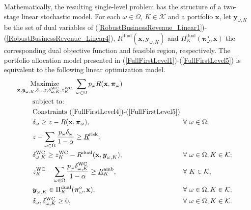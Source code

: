 	Mathematically, the resulting single-level problem has the structure of a two-stage linear stochastic model. For each $\omega \in \Omega$, $K \in \mathcal{K}$ and a portfolio $\mathbf{x}$, let $\boldsymbol{y}_{\omega, K}$ be the set of dual variables of (\ref{RobustBusinessRevenue_Linear1})-(\ref{RobustBusinessRevenue_Linear4}), $R^{\text{dual}}(\mathbf{x}, \boldsymbol{y}_{\omega, K})$ and $\Pi_{K}^{\text{dual}}(\boldsymbol{\pi}^{\text{o}}_{\omega}, \mathbf{x})$ the corresponding dual objective function and feasible region, respectively. The portfolio allocation model presented in (\ref{FullFirstLevel1})-(\ref{FullFirstLevel5}) is equivalent to the following linear optimization model.
%
\begin{align}
	& \hspace{-0.350cm} \Maximize_{\substack{\mathbf{x}, \boldsymbol{y}_{\omega, K}, \delta_{\omega}, z, \delta_{\omega, K}^{\text{WC}}, z_{K}^{\text{WC}}}} ~ \sum_{\omega \in \Omega} p_{\omega} R(\mathbf{x}, \boldsymbol{\pi}_{\omega}) && \label{CompleteModel1} \\
	& \hspace{0.50cm} \text{subject to:} \notag \\
	& \hspace{0.50cm} \text{Constraints} ~ (\ref{FullFirstLevel4})\text{-}(\ref{FullFirstLevel5}) \label{CompleteModel2} \\
	& \hspace{0.50cm} \delta_{\omega} \geq z - R(\mathbf{x}, \boldsymbol{\pi}_{\omega}), && \hspace{-0.20cm} \forall ~ \omega \in \Omega; \label{CompleteModel3} \\
	& \hspace{0.50cm} z - \sum_{\omega \in \Omega} \frac{p_{\omega} \delta_{\omega}}{1 - \alpha} \geq \underline{R}^{\text{risk}}; && \label{CompleteModel4} \\
	& \hspace{0.50cm} \delta_{\omega, K}^{\text{WC}} \geq z_{K}^{\text{WC}} - R^{\text{dual}}(\mathbf{x}, \boldsymbol{y}_{\omega, K}), && \hspace{-0.20cm} \forall ~ \omega \in \Omega, K \in \mathcal{K}; \label{CompleteModel5} \\
	& \hspace{0.50cm} z_{K}^{\text{WC}} - \sum_{\omega \in \Omega} \frac{p_{\omega} \delta_{\omega, K}^{\text{WC}}}{1 - \alpha} \geq \underline{R}_{K}^{\text{amb}}, && \hspace{-0.20cm} \forall ~ K \in \mathcal{K}; \label{CompleteModel6} \\
	& \hspace{0.50cm} \boldsymbol{y}_{\omega, K} \in \Pi_{K}^{\text{dual}}(\boldsymbol{\pi}^{\text{o}}_{\omega}, \mathbf{x}), && \hspace{-0.20cm} \forall ~ \omega \in \Omega, K \in \mathcal{K}; \label{CompleteModel7} \\
	& \hspace{0.50cm} \delta_{\omega}, \delta_{\omega, K}^{\text{WC}} \geq 0, && \hspace{-0.20cm} \forall ~ \omega \in \Omega, K \in \mathcal{K}. \label{CompleteModel8}
\end{align}

